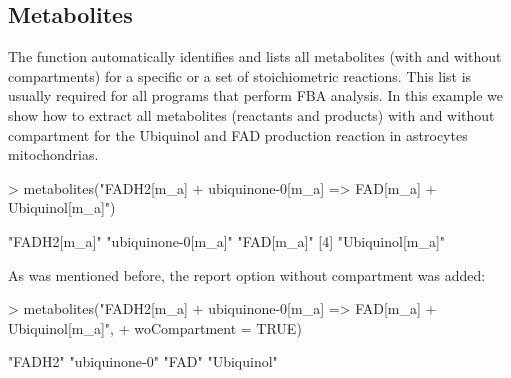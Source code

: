 \subsection{Metabolites}
The  function automatically identifies and lists  all metabolites (with and without compartments) for a specific or a set of stoichiometric reactions.  This list is usually required for all programs that perform FBA analysis. In this example we show how to extract all metabolites (reactants and products) with and without compartment for the Ubiquinol and FAD production reaction in astrocytes mitochondrias.
\begin{Schunk}
\begin{Sinput}
> metabolites("FADH2[m_a] + ubiquinone-0[m_a] => FAD[m_a] + Ubiquinol[m_a]")
\end{Sinput}
\begin{Soutput}
[1] "FADH2[m_a]"        "ubiquinone-0[m_a]" "FAD[m_a]"         
[4] "Ubiquinol[m_a]"   
\end{Soutput}
As was mentioned before, the report option without compartment was added:
\begin{Sinput}
> metabolites("FADH2[m_a] + ubiquinone-0[m_a] => FAD[m_a] + Ubiquinol[m_a]",
+             woCompartment = TRUE)
\end{Sinput}
\begin{Soutput}
[1] "FADH2"        "ubiquinone-0" "FAD"          "Ubiquinol"   
\end{Soutput}
\end{Schunk}
